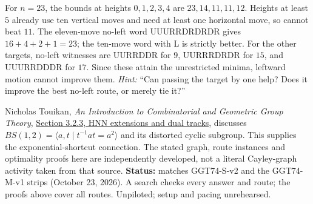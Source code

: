 \documentclass[11pt,letterpaper]{article}
\newcommand{\sect}[1]{\par\vspace{5pt}{\large\bfseries #1}\par\nopagebreak}
\begin{document}
For $n=23$, the bounds at heights $0,1,2,3,4$ are
$23,14,11,11,12$. Heights at least $5$ already use ten vertical moves and need
at least one horizontal move, so cannot beat $11$. The eleven-move no-left
word UUURRDRDRDR gives $16+4+2+1=23$; the ten-move word with L is strictly better.
For the other targets, no-left witnesses are UURRDDR for $9$,
UURRRDRDR for $15$, and UUURRDDDR for $17$. Since these attain the unrestricted
minima, leftward motion cannot improve them. \textit{Hint:} ``Can passing the
target by one help? Does it improve the best no-left route, or merely tie it?''

\sect{Source lineage and status}
Nicholas Touikan, \emph{An Introduction to Combinatorial and Geometric Group
Theory}, \href{https://ntouikan.ext.unb.ca/MATH6022/IntroCGGT/html_output/section-15.html}{Section 3.2.3, HNN extensions and dual tracks}, discusses
$BS(1,2)=\langle a,t\mid t^{-1}at=a^2\rangle$ and its distorted cyclic subgroup.
This supplies the exponential-shortcut connection. The stated graph, route
instances and optimality proofs here are independently developed, not a literal
Cayley-graph activity taken from that source.
\textbf{Status:} matches GGT74-S-v2 and the GGT74-M-v1 strips (October 23, 2026).
A search checks every answer and route; the proofs above cover all routes.
Unpiloted; setup and pacing unrehearsed.
\end{document}

